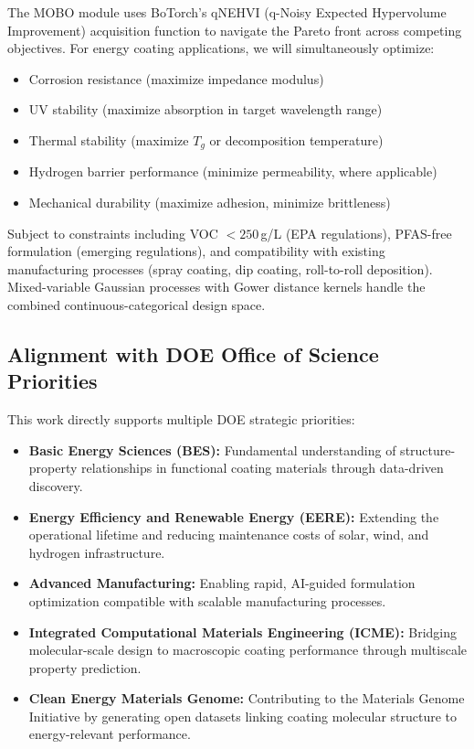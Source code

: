 \documentclass[11pt,letterpaper]{article}
\begin{document}
The MOBO module uses BoTorch's qNEHVI (q-Noisy Expected Hypervolume Improvement) acquisition function to navigate the Pareto front across competing objectives. For energy coating applications, we will simultaneously optimize:

\begin{itemize}[noitemsep]
  \item Corrosion resistance (maximize impedance modulus)
  \item UV stability (maximize absorption in target wavelength range)
  \item Thermal stability (maximize $T_g$ or decomposition temperature)
  \item Hydrogen barrier performance (minimize permeability, where applicable)
  \item Mechanical durability (maximize adhesion, minimize brittleness)
\end{itemize}

Subject to constraints including VOC $< 250$\,g/L (EPA regulations), PFAS-free formulation (emerging regulations), and compatibility with existing manufacturing processes (spray coating, dip coating, roll-to-roll deposition). Mixed-variable Gaussian processes with Gower distance kernels handle the combined continuous-categorical design space.

\subsection{Alignment with DOE Office of Science Priorities}

This work directly supports multiple DOE strategic priorities:

\begin{itemize}[noitemsep]
  \item \textbf{Basic Energy Sciences (BES):} Fundamental understanding of structure-property relationships in functional coating materials through data-driven discovery.
  \item \textbf{Energy Efficiency and Renewable Energy (EERE):} Extending the operational lifetime and reducing maintenance costs of solar, wind, and hydrogen infrastructure.
  \item \textbf{Advanced Manufacturing:} Enabling rapid, AI-guided formulation optimization compatible with scalable manufacturing processes.
  \item \textbf{Integrated Computational Materials Engineering (ICME):} Bridging molecular-scale design to macroscopic coating performance through multiscale property prediction.
  \item \textbf{Clean Energy Materials Genome:} Contributing to the Materials Genome Initiative by generating open datasets linking coating molecular structure to energy-relevant performance.
\end{itemize}
\end{document}
